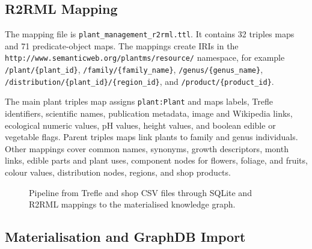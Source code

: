 \documentclass[11pt,a4paper]{article}
\newcommand{\artifact}[1]{\texttt{#1}}
\begin{document}
\subsection{R2RML Mapping}

The mapping file is \artifact{plant\_management\_r2rml.ttl}. It contains
32 triples maps and 71 predicate-object maps. The mappings create IRIs in the
\artifact{http://www.semanticweb.org/plantms/resource/} namespace, for example
\artifact{/plant/\{plant\_id\}}, \artifact{/family/\{family\_name\}},
\artifact{/genus/\{genus\_name\}}, \artifact{/distribution/\{plant\_id\}/\{region\_id\}},
and \artifact{/product/\{product\_id\}}.

The main plant triples map assigns \artifact{plant:Plant} and maps labels,
Trefle identifiers, scientific names, publication metadata, image and Wikipedia
links, ecological numeric values, pH values, height values, and boolean edible
or vegetable flags. Parent triples maps link plants to family and genus
individuals. Other mappings cover common names, synonyms, growth descriptors,
month links, edible parts and plant uses, component nodes for flowers, foliage,
and fruits, colour values, distribution nodes, regions, and shop products.

\begin{figure}[h]
\centering
{}
\caption{Pipeline from Trefle and shop CSV files through SQLite and R2RML mappings to the materialised knowledge graph.}
\label{fig:obda-pipeline}
\end{figure}

\subsection{Materialisation and GraphDB Import}
\end{document}
